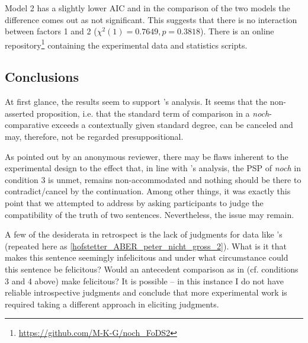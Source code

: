 \documentclass[output=paper]{langsci/langscibook}
\begin{document}
Model 2 has a slightly lower AIC and in the comparison of the two models the difference comes out as not significant. This suggests that there is no interaction between factors 1 and 2 ($\chi^{2}(1)=0.7649, p=0.3818$). There is an online repository\footnote{\url{https://github.com/M-K-G/noch_FoDS2}} containing the experimental data and statistics scripts.

\subsection{Conclusions}
At first glance, the results seem to support \citeauthor{umbach2009a_comp}'s \citeyearpar{umbach2009a_comp} analysis. It seems that the non-asserted proposition, i.e. that the standard term of comparison in a \textit{noch}-comparative exceeds a contextually given standard degree, can be canceled and may, therefore, not be regarded presuppositional.

As pointed out by an anonymous reviewer, there may be flaws inherent to the experimental design to the effect that, in line with \citeauthor{Hofstetter2013}'s analysis, the PSP of \textit{noch} in condition 3 is unmet, remains non-accommodated and nothing should be there to contradict/cancel by the continuation. Among other things, it was exactly this point that we attempted to address by asking participants to judge the compatibility of the truth of two sentences. Nevertheless, the issue may remain.\largerpage

A few of the desiderata in retrospect is the lack of judgments for data like \citeauthor{Hofstetter2013}'s  (repeated here as \ref{hofstetter_ABER_peter_nicht_gross_2}). What is it that makes this sentence seemingly infelicitous and under what circumstance could this sentence be felicitous? Would an antecedent comparison as in  (cf. conditions 3 and 4 above) make  felicitous? It is possible -- in this instance I do not have reliable introspective judgments and conclude that more experimental work is required taking a different approach in eliciting judgments. %
\end{document}
